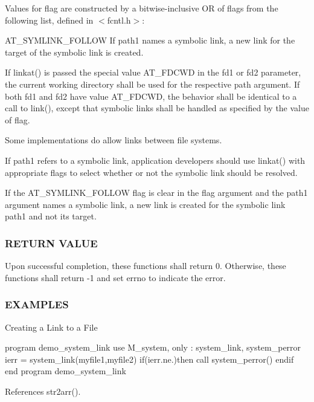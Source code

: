 Values for flag are constructed by a bitwise-\/inclusive OR of flags from the following list, defined in $<$fcntl.\+h$>$\+:

A\+T\+\_\+\+S\+Y\+M\+L\+I\+N\+K\+\_\+\+F\+O\+L\+L\+OW If path1 names a symbolic link, a new link for the target of the symbolic link is created.

If linkat() is passed the special value A\+T\+\_\+\+F\+D\+C\+WD in the fd1 or fd2 parameter, the current working directory shall be used for the respective path argument. If both fd1 and fd2 have value A\+T\+\_\+\+F\+D\+C\+WD, the behavior shall be identical to a call to link(), except that symbolic links shall be handled as specified by the value of flag.

Some implementations do allow links between file systems.

If path1 refers to a symbolic link, application developers should use linkat() with appropriate flags to select whether or not the symbolic link should be resolved.

If the A\+T\+\_\+\+S\+Y\+M\+L\+I\+N\+K\+\_\+\+F\+O\+L\+L\+OW flag is clear in the flag argument and the path1 argument names a symbolic link, a new link is created for the symbolic link path1 and not its target.

\subsubsection*{R\+E\+T\+U\+RN V\+A\+L\+UE}

Upon successful completion, these functions shall return 0. Otherwise, these functions shall return -\/1 and set errno to indicate the error.

\subsubsection*{E\+X\+A\+M\+P\+L\+ES}

Creating a Link to a File

program demo\+\_\+system\+\_\+link use M\+\_\+system, only \+: system\+\_\+link, system\+\_\+perror ierr = system\+\_\+link(\textquotesingle{}myfile1\textquotesingle{},\textquotesingle{}myfile2\textquotesingle{}) if(ierr.\+ne.)then call system\+\_\+perror(\textquotesingle{}) endif end program demo\+\_\+system\+\_\+link 

References str2arr().

